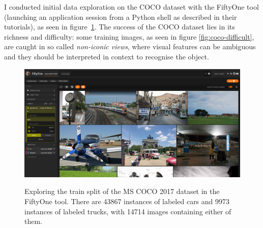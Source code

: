 I conducted initial data exploration on the COCO dataset with the FiftyOne tool (launching an application session from a Python shell as described in their tutorials), as seen in figure~\ref{fig:fiftyone-car-truck}. The success of the COCO dataset lies in its richness and difficulty: some training images, as seen in figure \ref{fig:coco-difficult}, are caught in so called \textit{non-iconic views}, where visual features can be ambiguous and they should be interpreted in context to recognise the object.


\begin{figure}[h]
    \captionsetup{width=\textwidth}
    \caption{Exploring the train split of the MS COCO 2017 dataset in the FiftyOne tool. There are 43867 instances of labeled cars and 9973 instances of labeled trucks, with 14714 images containing either of them.}
    \includegraphics[width=\textwidth]{figures/fiftyone-coco-car-truck.png}\label{fig:fiftyone-car-truck}
\end{figure}


